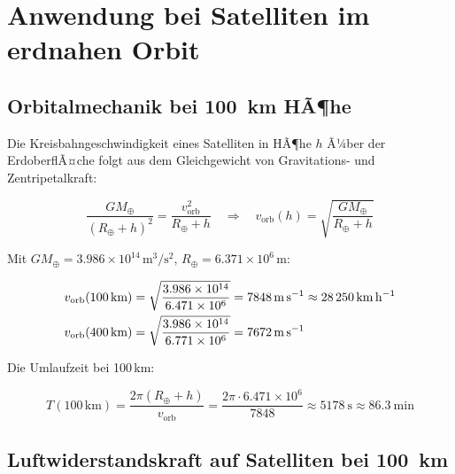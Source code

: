 ﻿\documentclass[12pt, a4paper]{report}
\theoremstyle{definition}
\theoremstyle{remark}
\begin{document}
\chapter{Anwendung bei Satelliten im erdnahen Orbit}
\label{chap:satellit}

\section{Orbitalmechanik bei \SI{100}{\kilo\metre} HÃ¶he}

Die Kreisbahngeschwindigkeit eines Satelliten in HÃ¶he $h$ Ã¼ber der ErdoberflÃ¤che
folgt aus dem Gleichgewicht von Gravitations- und Zentripetalkraft:

\begin{equation}
  \frac{GM_\oplus}{(R_\oplus + h)^2} = \frac{v_{\text{orb}}^2}{R_\oplus + h}
  \quad\Rightarrow\quad
  v_{\text{orb}}(h) = \sqrt{\frac{GM_\oplus}{R_\oplus + h}}
  \label{eq:v_orb}
\end{equation}

Mit $GM_\oplus = 3.986 \times 10^{14}\,\text{m}^3/\text{s}^2$,
$R_\oplus = 6.371 \times 10^6\,\text{m}$:

\begin{align}
  v_{\text{orb}}(100\,\text{km}) &= \sqrt{\frac{3.986 \times 10^{14}}{6.471 \times 10^6}}
  = \SI{7\,848}{\metre\per\second} \approx \SI{28\,250}{\kilo\metre\per\hour}
  \label{eq:v100km} \\
  v_{\text{orb}}(400\,\text{km}) &= \sqrt{\frac{3.986 \times 10^{14}}{6.771 \times 10^6}}
  = \SI{7\,672}{\metre\per\second}
  \label{eq:v400km}
\end{align}

Die Umlaufzeit bei 100\,km:

\begin{equation}
  T(100\,\text{km}) = \frac{2\pi(R_\oplus + h)}{v_{\text{orb}}} =
  \frac{2\pi \cdot 6.471 \times 10^6}{7848}
  \approx \SI{5178}{\second} \approx \SI{86.3}{\minute}
  \label{eq:t_orb}
\end{equation}

\section{Luftwiderstandskraft auf Satelliten bei \SI{100}{\kilo\metre}}
\end{document}
